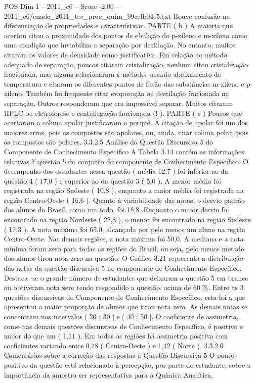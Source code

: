 \begin{textsample}{POS Dim 1 – 2011\_c6 – Score -2.00 – 2011\_c6/enade\_2011\_tec\_proc\_quim\_99cefb04e5.txt}
Houve confusão na diferenciação de propriedades e características.
PARTE ( b ) A maioria que acertou citou a proximidade dos pontos de ebulição do p-xileno e m-xileno como uma condição que inviabiliza a separação por destilação.
No entanto, muitos citaram os valores de densidade como justificativa.
Em relação ao método adequado de separação, poucos citaram cristalização, nenhum citou cristalização fracionada, mas alguns relacionaram a métodos usando abaixamento de temperatura e citaram os diferentes pontos de fusão das substâncias m-xileno e p-xileno.
Também foi frequente citar evaporação ou destilação fracionada na separação.
Outros responderam que era impossível separar.
Muitos citaram HPLC ou eletroforese e centrifugação fracionada (! ).
PARTE ( c ) Poucos que acertaram a coluna apolar justificaram o porquê.
A citação de apolar foi um dos maiores erros, pois os compostos são apolares, ou, ainda, citar coluna polar, pois os compostos são polares. 3.3.2.5 Análise da Questão Discursiva 5 do Componente de Conhecimento Específico A Tabela 3.14 contém as informações relativas à questão 5 do conjunto do componente de Conhecimento Específico.
O desempenho dos estudantes nessa questão ( média 12,7 ) foi inferior ao da questão 4 ( 17,0 ) e superior ao da questão 3 ( 5,0 ).
A menor média foi registrada na região Sudeste ( 10,8 ), enquanto a maior média foi registrada na região Centro-Oeste ( 16,6 ).
Quanto à variabilidade das notas, o desvio padrão dos alunos do Brasil, como um todo, foi 18,8.
Enquanto o maior desvio foi encontrado na região Nordeste ( 22,8 ), o menor foi encontrado na região Sudeste ( 17,3 ).
A nota máxima foi 65,0, alcançada por pelo menos um aluno na região Centro-Oeste.
Nas demais regiões, a nota máxima foi 50,0.
A mediana e a nota mínima foram zero para todas as regiões do Brasil, ou seja, pelo menos metade dos alunos tirou nota zero na questão.
O Gráfico 3.21 representa a distribuição das notas da questão discursiva 5 no componente de Conhecimento Específico.
Destaca -se o grande número de estudantes que deixaram a questão 5 em branco ou obtiveram nota zero tendo respondido a questão, acima de 60 \%.
Entre as 3 questões discursivas do Componente de Conhecimento Específico, esta foi a que apresentou a maior proporção de alunos que tirou nota zero.
As demais notas se concentram nos intervalos ( 20 ; 30 ] e ( 40 ; 50 ].
O coeficiente de assimetria, como nas demais questões discursivas de Conhecimento Específico, é positivo e maior do que um ( 1,11 ).
Em todas as regiões há assimetria positiva com coeficientes variando entre 0,78 ( Centro-Oeste ) e 1,42 ( Norte ). 3.3.2.6 Comentários sobre a correção das respostas à Questão Discursiva 5 O ponto positivo da questão está relacionado à percepção, por parte do estudante, sobre a importância da amostra ser representativa para a Química Analítica.

\end{textsample}
